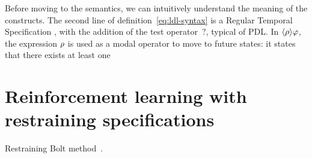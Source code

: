 Before moving to the semantics, we can intuitively understand the meaning of
the constructs. The second line of definition~\eqref{eq:ldl-syntax} is a
Regular Temporal Specification \re{}, with the addition of the test
operator~$?$, typical of PDL. In $\langle \rho \rangle \varphi$, the \re{}
expression $\rho$ is used as a modal operator to move to future states: it
states that there exists at least one 

\section{Reinforcement learning with restraining specifications}
Restraining Bolt method~\cite{bib:bolt}\cite{bib:rb-imitation-l}.

